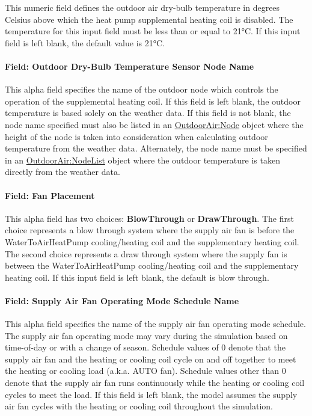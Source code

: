 This numeric field defines the outdoor air dry-bulb temperature in degrees Celsius above which the heat pump supplemental heating coil is disabled. The temperature for this input field must be less than or equal to 21°\si{C}. If this input field is left blank, the default value is 21°\si{C}.

\paragraph{Field: Outdoor Dry-Bulb Temperature Sensor Node Name}\label{field-outdoor-dry-bulb-temperature-sensor-node-name-000}

This alpha field specifies the name of the outdoor node which controls the operation of the supplemental heating coil. If this field is left blank, the outdoor temperature is based solely on the weather data. If this field is not blank, the node name specified must also be listed in an \hyperref[outdoorairnode]{OutdoorAir:Node} object where the height of the node is taken into consideration when calculating outdoor temperature from the weather data. Alternately, the node name must be specified in an \hyperref[outdoorairnodelist]{OutdoorAir:NodeList} object where the outdoor temperature is taken directly from the weather data.

\paragraph{Field: Fan Placement}\label{field-fan-placement-5-000}

This alpha field has two choices: \textbf{BlowThrough} or \textbf{DrawThrough}. The first choice represents a blow through system where the supply air fan is before the WaterToAirHeatPump cooling/heating coil and the supplementary heating coil. The second choice represents a draw through system where the supply fan is between the WaterToAirHeatPump cooling/heating coil and the supplementary heating coil. If this input field is left blank, the default is blow through.

\paragraph{Field: Supply Air Fan Operating Mode Schedule Name}\label{field-supply-air-fan-operating-mode-schedule-name-6}

This alpha field specifies the name of the supply air fan operating mode schedule. The supply air fan operating mode may vary during the simulation based on time-of-day or with a change of season. Schedule values of 0 denote that the supply air fan and the heating or cooling coil cycle on and off together to meet the heating or cooling load (a.k.a. AUTO fan). Schedule values other than 0 denote that the supply air fan runs continuously while the heating or cooling coil cycles to meet the load. If this field is left blank, the model assumes the supply air fan cycles with the heating or cooling coil throughout the simulation.

